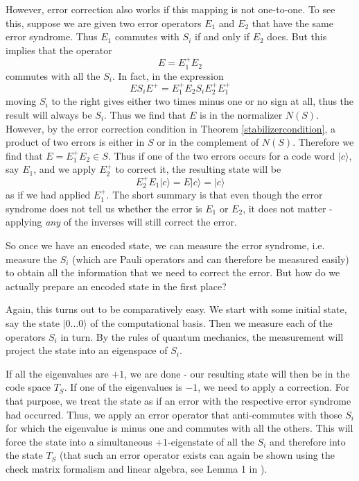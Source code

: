 \documentclass[a4paper, draft]{article}
\theoremstyle{own}
\theoremstyle{remark}
\begin{document}
However, error correction also works if this mapping is not one-to-one. To see this, suppose we are given two error operators $E_1$ and $E_2$ that have the same error syndrome. Thus $E_1$ commutes with $S_i$ if and only if $E_2$ does. But this implies that the operator
$$
E = E_1^+ E_2
$$
commutes with all the $S_i$. In fact, in the expression
$$
E S_i E^+ = E_1^+ E_2 S_i E_2^+ E_1^+
$$
moving $S_i$ to the right gives either two times minus one or no sign at all, thus the result will always be $S_i$. Thus we find that $E$ is in the normalizer $N(S)$. However, by the error correction condition in Theorem \ref{stabilizercondition}, a product of two errors is either in $S$ or in the complement of $N(S)$. Therefore we find that $E = E_1^+ E_2 \in S$. Thus if one of the two errors occurs for a code word $|c \rangle$, say $E_1$, and we apply $E_2^+$ to correct it, the resulting state will be
$$
E_2^+ E_1 |c \rangle = E |c \rangle = |c \rangle
$$
as if we had applied $E_1^+$. The short summary is that even though the error syndrome does not tell us whether the error is $E_1$ or $E_2$, it does not matter - applying \emph {any} of the inverses will still correct the error.

So once we have an encoded state, we can measure the error syndrome, i.e. measure the $S_i$ (which are Pauli operators and can therefore be measured easily) to obtain all the information that we need to correct the error. But how do we actually prepare an encoded state in the first place?

Again, this turns out to be comparatively easy. We start with some initial state, say the state $|0 \dots 0 \rangle$ of the computational basis. Then we measure each of the operators $S_i$ in turn. By the rules of quantum mechanics, the measurement will project the state into an eigenspace of $S_i$. 

If all the eigenvalues are $+1$, we are done - our resulting state will then be in the code space $T_S$. If one of the eigenvalues is $-1$, we need to apply a correction. For that purpose, we treat the state as if an error with the respective error syndrome had occurred. Thus, we apply an error operator that anti-commutes with those $S_i$ for which the eigenvalue is minus one and commutes with all the others. This will force the state into a simultaneous $+1$-eigenstate of all the $S_i$ and therefore into the state $T_S$ (that such an error operator exists can again be shown using the check matrix formalism and linear algebra, see Lemma 1 in \cite{G1}). 
\end{document}
